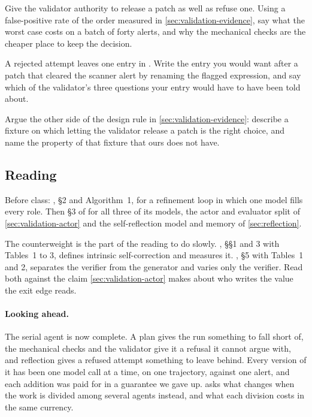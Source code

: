 \be

\item Give the validator authority to release a patch as well as refuse one. Using a false-positive
rate of the order measured in \cref{sec:validation-evidence}, say what the worst case costs on a
batch of forty alerts, and why the mechanical checks are the cheaper place to keep the decision.

\item A rejected attempt leaves one entry in . Write the entry you would want
after a patch that cleared the scanner alert by renaming the flagged expression, and say which of
the validator's three questions your entry would have to have been told about.

\item Argue the other side of the design rule in \cref{sec:validation-evidence}: describe a fixture
on which letting the validator release a patch is the right choice, and name the property of that
fixture that ours does not have.

\ee

\subsection{Reading}

Before class: \citet{madaan2023selfrefine}, \S2 and Algorithm~1, for a refinement loop in which one
model fills every role. Then \S3 of \citet{shinn2023reflexion} for all three of its models, the
actor and evaluator split of \cref{sec:validation-actor} and the self-reflection model and memory of
\cref{sec:reflection}.

The counterweight is the part of the reading to do slowly. \citet{huang2024selfcorrect}, \S\S1 and 3
with Tables~1 to 3, defines intrinsic self-correction and measures it. \citet{stechly2025selfverification},
\S5 with Tables~1 and 2, separates the verifier from the generator and varies only the verifier.
Read both against the claim \cref{sec:validation-actor} makes about who writes the value the exit
edge reads.

\paragraph{Looking ahead.}
The serial agent is now complete. A plan gives the run something to fall short of, the mechanical
checks and the validator give it a refusal it cannot argue with, and reflection gives a refused
attempt something to leave behind. Every version of it has been one model call at a time, on one
trajectory, against one alert, and each addition was paid for in a guarantee we gave up.
 asks what changes when the work is divided among several agents instead, and
what each division costs in the same currency.
